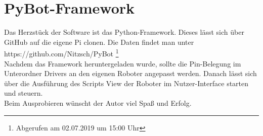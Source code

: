 \documentclass[twoside,11pt, a4paper]{report}
\begin{document}
	\section{PyBot-Framework}
	Das Herzstück der Software ist das Python-Framework. Dieses lässt sich über GitHub auf die eigene Pi clonen. Die Daten findet man unter https://github.com/Nitzsch/PyBot \footnote{Abgerufen am 02.07.2019 um 15:00 Uhr}\\
	Nachdem das Framework heruntergeladen wurde, sollte die Pin-Belegung im Unterordner Drivers an den eigenen Roboter angepasst werden. Danach lässt sich über die Ausführung des Scripts View der Roboter im Nutzer-Interface starten und steuern. \\
	Beim Ausprobieren wünscht der Autor viel Spaß und Erfolg. 

	
	
	
	
	
	

	
\end{document}
